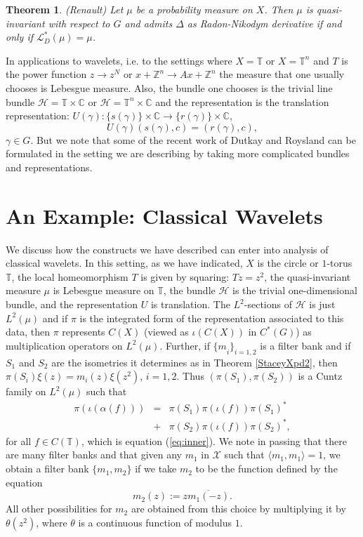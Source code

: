 \documentclass{amsproc}
\theoremstyle{plain}
\newtheorem{thm}{Theorem}[section]
\theoremstyle{definition}
\theoremstyle{definition}
\theoremstyle{remark}
\theoremstyle{plain}
\begin{document}
\begin{thm}
(Renault) Let $\mu$ be a probability measure on $X$. Then $\mu$
is quasi-invariant with respect to $G$ and admits $\Delta$ as Radon-Nikodym
derivative if and only if $\mathcal{L}_{D}^{*}(\mu)=\mu$. 
\end{thm}
In applications to wavelets, i.e. to the settings where $X=\mathbb{T}$
or $X=\mathbb{T}^{n}$ and $T$ is the power function $z\to z^{N}$
or $x+\mathbb{Z}^{n}\to Ax+\mathbb{Z}^{n}$ the measure that one usually
chooses is Lebesgue measure. Also, the bundle one chooses is the trivial
line bundle $\mathcal{H}=\mathbb{T}\times\mathbb{C}$ or
$\mathcal{H}=\mathbb{T}^{n}\times\mathbb{C}$
and the representation is the translation representation: $U(\gamma):\{
s(\gamma)\}\times\mathbb{C}\to\{ r(\gamma)\}\times\mathbb{C}$,\[
U(\gamma)(s(\gamma),c)=(r(\gamma),c),\]
$\gamma\in G$. But we note that some of the recent work of Dutkay
and Roysland \cite{DR06,DR07} can be formulated in the setting we
are describing by taking more complicated bundles and representations.


\section{An Example: Classical Wavelets}

We discuss how the constructs we have described can enter into analysis
of classical wavelets. In this setting, as we have indicated, $X$
is the circle or $1$-torus $\mathbb{T}$, the local homeomorphism
$T$ is given by squaring: $Tz=z^{2}$, the quasi-invariant measure
$\mu$ is Lebesgue measure on $\mathbb{T}$, the bundle $\mathcal{H}$
is the trivial one-dimensional bundle, and the representation $U$
is translation. The $L^{2}$-sections of $\mathcal{H}$ is just $L^{2}(\mu)$
and if $\pi$ is the integrated form of the representation associated
to this data, then $\pi$ represents $C(X)$ (viewed as $\iota(C(X))$
in $C^{*}(G)$) as multiplication operators on $L^{2}(\mu)$. Further,
if ${\{ m}_{i}\}_{i=1,2}$ is a filter bank and if $S_{1}$ and $S_{2}$
are the isometries it determines as in Theorem \ref{StaceyXpd2},
then $\pi(S_{i})\xi(z)=m_{i}(z)\xi(z^{2})$, $i=1,2$. Thus
$(\pi(S_{1}),\pi(S_{2}))$
is a Cuntz family on $L^{2}(\mu)$ such that\begin{eqnarray*}
\pi(\iota(\alpha(f))) & = & \pi(S_{1})\pi(\iota(f))\pi(S_{1})^{*}\\
 & + & \pi(S_{2})\pi(\iota(f))\pi(S_{2})^{*},\end{eqnarray*}
for all $f\in C(\mathbb{T})$, which is equation (\ref{eq:inner}).
We note in passing that there are many filter banks and that given
any $m_{1}$ in $\mathcal{X}$ such that $\langle m_{1},m_{1}\rangle=1$,
we obtain a filter bank $\{ m_{1},m_{2}\}$ if we take $m_{2}$ to
be the function defined by the equation \[
m_{2}(z):=z\overline{m_{1}(-z)}.\]
All other possibilities for $m_{2}$ are obtained from this choice
by multiplying it by $\theta(z^{2})$, where $\theta$ is a continuous
function of modulus $1$.
\end{document}
